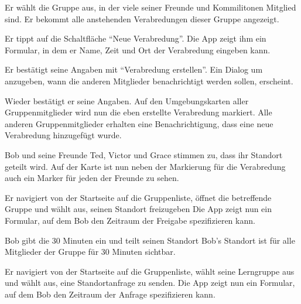 \documentclass[parskip=full,11pt]{scrartcl}
\begin{document}
{Er wählt die Gruppe aus, in der viele seiner Freunde und Kommilitonen Mitglied sind.}
{Er bekommt alle anstehenden Verabredungen dieser Gruppe angezeigt.}

{Er tippt auf die Schaltfläche \enquote{Neue Verabredung}.}
{Die App zeigt ihm ein Formular, in dem er Name, Zeit und Ort der Verabredung eingeben kann.}

{Er bestätigt seine Angaben mit \enquote{Verabredung erstellen}.}
{Ein Dialog um anzugeben, wann die anderen Mitglieder benachrichtigt werden sollen, erscheint.}

{Wieder bestätigt er seine Angaben.}
{Auf den Umgebungskarten aller Gruppenmitglieder wird nun die eben erstellte Verabredung markiert.
Alle anderen Gruppenmitglieder erhalten eine Benachrichtigung,
dass eine neue Verabredung hinzugefügt wurde.}

{Bob und seine Freunde Ted, Victor und Grace stimmen zu, dass ihr Standort geteilt wird.}
{Auf der Karte ist nun neben der Markierung für die Verabredung auch ein Marker für
jeden der Freunde zu sehen.}


{Er navigiert von der Startseite auf die Gruppenliste, öffnet die betreffende Gruppe und wählt aus, seinen Standort freizugeben}
{Die App zeigt nun ein Formular, auf dem Bob den Zeitraum der Freigabe spezifizieren kann.}

{Bob gibt die 30 Minuten ein und teilt seinen Standort}
{Bob's Standort ist für alle Mitglieder der Gruppe für 30 Minuten sichtbar.}


{Er navigiert von der Startseite auf die Gruppenliste, wählt seine Lerngruppe aus und wählt aus, eine Standortanfrage zu senden.}
{Die App zeigt nun ein Formular, auf dem Bob den Zeitraum der Anfrage spezifizieren kann.}
\end{document}
